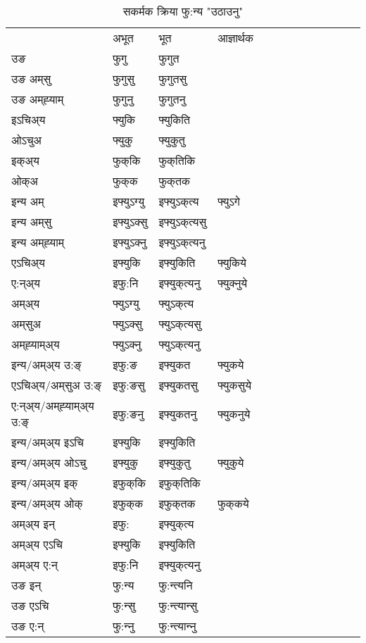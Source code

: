\begin{table}[H]
\centering
\caption{\label{uk.vt} सकर्मक क्रिया  फु:न्य  "उठाउनु"  }
\begin{tabular}{l|l|l|l|l|l|l|l|l|l|l|l|l}  \toprule
&अभूत & भूत & आज्ञार्थक \\ 
उङ &फुगु &फुगुत \\ 
उङ अम्‌सु &फुगुसु &फुगुतसु \\ 
उङ अम्‌ह्‍याम् &फुगुनु &फुगुतनु \\ 
इऽचिअ्य &फ्युकि &फ्युकिति   \\ 
ओऽचुअ &फ्युकु &फ्युकुतु   \\ 
इक्अ्य &फुक्‌कि &फुक्‌तिकि   \\ 
ओक्अ &फुक्‌क &फुक्‌तक   \\ 
इन्य अम् & इफ्युऽग्यु  & इफ्युऽक्‌त्य &फ्युऽगे  \\ 
इन्य अम्‌सु & इफ्युऽक्सु  & इफ्युऽक्‌त्यसु   \\ 
इन्य अम्‌ह्‍याम् & इफ्युऽक्‍नु  & इफ्युऽक्‌त्यनु   \\ 
एऽचिअ्य & इफ्युकि & इफ्युकिति &फ्युकिये    \\ 
ए:न्अ्य & इफु:नि  & इफ्युक्‌त्यनु &फ्युक्‍नुये  \\ 
अम्अ्य & फ्युऽग्यु  & फ्युऽक्‌त्य  \\ 
अम्‌सुअ & फ्युऽक्सु & फ्युऽक्‌त्यसु  \\ 
अम्‌ह्‍याम्अ्य & फ्युऽक्‍नु  & फ्युऽक्‌त्यनु \\ 
\midrule
इन्य/अम्अ्य उ:ङ्‌&इफु:ङ & इफ्युकत &फ्युकये \\ 
एऽचिअ्य/अम्‌सुअ उ:ङ्‌ &इफु:ङसु & इफ्युकतसु &फ्युकसुये \\ 
ए:न्अ्य/अम्‌ह्‍याम्अ्य उ:ङ्‌ &इफु:ङनु & इफ्युकतनु &फ्युकनुये \\ 
इन्य/अम्अ्य इऽचि & इफ्युकि & इफ्युकिति    \\ 
इन्य/अम्अ्य ओऽचु & इफ्युकु & इफ्युकुतु  &फ्युकुये  \\ 
इन्य/अम्अ्य इक् & इफुक्‌कि & इफुक्‌तिकि   \\ 
इन्य/अम्अ्य ओक् & इफुक्‌क & इफुक्‌तक  &फुक्‌कये  \\ 
अम्अ्य इन् & इफु: & इफ्युक्‌त्य   \\ 
अम्अ्य एऽचि & इफ्युकि & इफ्युकिति    \\ 
अम्अ्य ए:न् & इफु:नि  & इफ्युक्‌त्यनु  \\ 
\midrule
उङ इन् & फु:न्य  & फु:न्त्यनि  \\ 
उङ एऽचि & फु:न्सु  & फु:न्त्यान्सु   \\ 
उङ ए:न्& फु:न्‍नु  & फु:न्त्यान्‍नु   \\ 
\bottomrule
\end{tabular}
\end{table}


